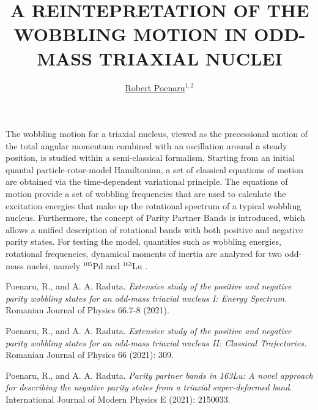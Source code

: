 ﻿\documentclass[a4paper,10pt,english]{article}
\begin{document}
\title{A REINTEPRETATION OF THE WOBBLING MOTION IN ODD-MASS TRIAXIAL NUCLEI}


\author{\uline{Robert Poenaru}$^{1,2}$}

\maketitle

\address{$^{1}$Doctoral School of Physics, University of Bucharest, Bucharest, Romania}

\address{$^{2}$Department of Theoretical Physics, NIPNE-HH, Magurele, Romania}


The wobbling motion for a triaxial nucleus, viewed as the precessional motion of the total angular momentum combined with an oscillation around a steady position, is studied within a semi-classical formalism. Starting from an initial quantal particle-rotor-model Hamiltonian, a set of classical equations of motion are obtained via the time-dependent variational principle. The equations of motion provide a set of wobbling frequencies that are used to calculate the excitation energies that make up the rotational spectrum of a typical wobbling nucleus. Furthermore, the concept of Parity Partner Bands is introduced, which allows a unified description of rotational bands with both positive and negative parity states. For testing the model, quantities such as wobbling energies, rotational frequencies, dynamical moments of inertia are analyzed for two odd-mass nuclei, namely $^{105}$Pd and $^{163}$Lu \cite{poenaru_rjp1,poenaru_rjp2,poenaru_ijmpe}.

\begin{thebibliography}{References}

 Poenaru, R., and A. A. Raduta. \textit{Extensive study of the positive and negative parity wobbling states for an odd-mass triaxial nucleus I: Energy Spectrum.} Romanian Journal of Physics 66.7-8 (2021).

 Poenaru, R., and A. A. Raduta. \textit{Extensive study of the positive and negative parity wobbling states for an odd-mass triaxial nucleus II: Classical Trajectories.} Romanian Journal of Physics 66 (2021): 309.

 Poenaru, R., and A. A. Raduta. \textit{Parity partner bands in 163Lu: A novel approach for describing the negative parity states from a triaxial super-deformed band.} International Journal of Modern Physics E (2021): 2150033.

\end{thebibliography}
\end{document}

